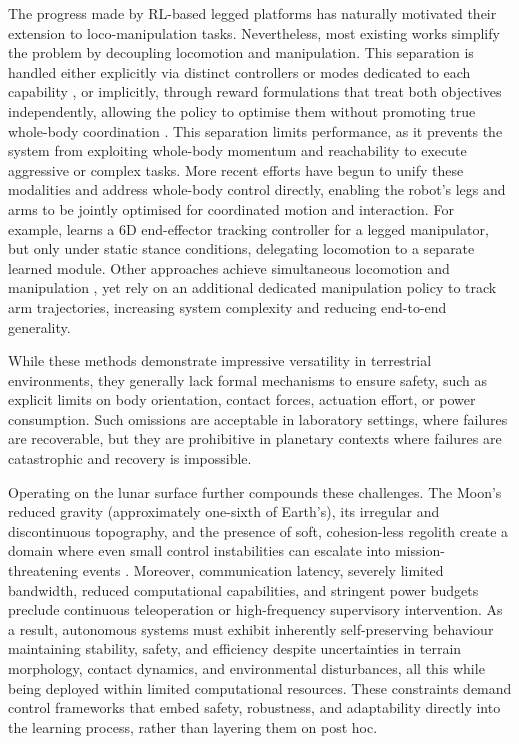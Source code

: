The progress made by RL-based legged platforms has naturally motivated their extension to loco-manipulation tasks. Nevertheless, most existing works simplify the problem by decoupling locomotion and manipulation. This separation is handled either explicitly via distinct controllers or modes dedicated to each capability \citep{Ma2022Locomanip}, or implicitly, through reward formulations that treat both objectives independently, allowing the policy to optimise them without promoting true whole-body coordination \citep{fu2022deep}. This separation limits performance, as it prevents the system from exploiting whole-body momentum and reachability to execute aggressive or complex tasks. More recent efforts have begun to unify these modalities and address whole-body control directly, enabling the robot’s legs and arms to be jointly optimised for coordinated motion and interaction. For example, \citep{portela2025wholebodyendeffectorposetracking} learns a 6D end-effector tracking controller for a legged manipulator, but only under static stance conditions, delegating locomotion to a separate learned module. Other approaches achieve simultaneous locomotion and manipulation \citep{ha2024umilegs, He2024}, yet rely on an additional dedicated manipulation policy to track arm trajectories, increasing system complexity and reducing end-to-end generality.

While these methods demonstrate impressive versatility in terrestrial environments, they generally lack formal mechanisms to ensure safety, such as explicit limits on body orientation, contact forces, actuation effort, or power consumption. Such omissions are acceptable in laboratory settings, where failures are recoverable, but they are prohibitive in planetary contexts where failures are catastrophic and recovery is impossible.

Operating on the lunar surface further compounds these challenges. The Moon’s reduced gravity (approximately one-sixth of Earth’s), its irregular and discontinuous topography, and the presence of soft, cohesion-less regolith create a domain where even small control instabilities can escalate into mission-threatening events \citep{Kolvenbach2022}. Moreover, communication latency, severely limited bandwidth, reduced computational capabilities, and stringent power budgets preclude continuous teleoperation or high-frequency supervisory intervention. As a result, autonomous systems must exhibit inherently self-preserving behaviour maintaining stability, safety, and efficiency despite uncertainties in terrain morphology, contact dynamics, and environmental disturbances, all this while being deployed within limited computational resources. These constraints demand control frameworks that embed safety, robustness, and adaptability directly into the learning process, rather than layering them on post hoc.


